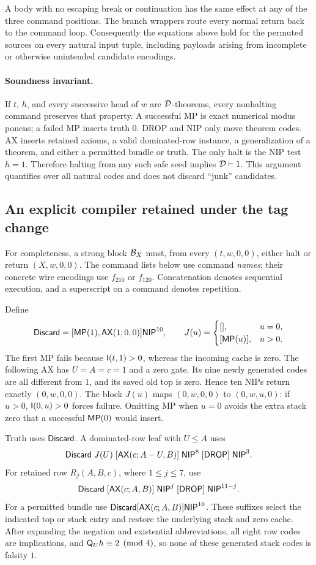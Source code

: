A body with no escaping break or continuation has the same effect at
any of the three command positions. The branch wrappers route every
normal return back to the command loop. Consequently the equations
above hold for the permuted sources on every natural input tuple,
including payloads arising from incomplete or otherwise unintended
candidate encodings.

\paragraph{Soundness invariant.}
If $t$, $h$, and every successive head of $w$ are $\mathcal D$-theorems,
every nonhalting command preserves that property. A successful MP is
exact numerical modus ponens; a failed MP inserts truth $0$. DROP and
NIP only move theorem codes. AX inserts retained axioms, a valid
dominated-row instance, a generalization of a theorem, and either a
permitted bundle or truth. The only halt is the NIP test $h=1$.
Therefore halting from any such safe seed implies $\mathcal D\vdash1$.
This argument quantifies over all natural codes and does not discard
``junk'' candidates.

\subsection{An explicit compiler retained under the tag change}

For completeness, a strong block $\mathcal B_X$ must, from every $(t,w,0,0)$,
either halt or return $(X,w,0,0)$. The command lists below use command
\emph{names}; their concrete wire encodings use $f_{210}$ or $f_{120}$.
Concatenation denotes sequential execution, and a superscript on a
command denotes repetition.

Define
\[
 \mathsf{Discard}=[\mathsf{MP}(1),\mathsf{AX}(1;0,0)]\mathsf{NIP}^{10},\qquad
 J(u)=\begin{cases}[],&u=0,\\{}[\mathsf{MP}(u)],&u>0.\end{cases}
\]
The first MP fails because $\mathsf I(t,1)>0$, whereas the incoming cache is
zero. The following AX has $U=A=c=1$ and a zero gate. Its nine newly
generated codes are all different from $1$, and its saved old top is
zero. Hence ten NIPs return exactly $(0,w,0,0)$.
The block $J(u)$ maps $(0,w,0,0)$ to $(0,w,u,0)$: if $u>0$,
$\mathsf I(0,u)>0$ forces failure. Omitting MP when $u=0$ avoids the extra
stack zero that a successful $\mathsf{MP}(0)$ would insert.

Truth uses $\mathsf{Discard}$. A dominated-row leaf with $U\leq A$ uses
\[
 \mathsf{Discard}\;J(U)\;[\mathsf{AX}(c;A-U,B)]\;\mathsf{NIP}^8\;[\mathsf{DROP}]\;\mathsf{NIP}^3.
\]
For retained row $R_j(A,B,c)$, where $1\leq j\leq7$, use
\[
 \mathsf{Discard}\;[\mathsf{AX}(c;A,B)]\;\mathsf{NIP}^j\;[\mathsf{DROP}]\;\mathsf{NIP}^{11-j}.
\]
For a permitted bundle use
$\mathsf{Discard}[\mathsf{AX}(c;A,B)]\mathsf{NIP}^{10}$.
These suffixes select the indicated top or stack entry and restore the
underlying stack and zero cache. After expanding the negation and
existential abbreviations, all eight row codes are implications,
and $\mathsf Q_Uh\equiv2\pmod4$, so none of these generated stack codes is
falsity $1$.

